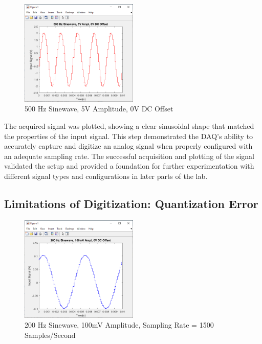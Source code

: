 \documentclass[12pt]{article}
\begin{document}
\begin{figure}[H]
	\centering
	\includegraphics[width=0.5\textwidth]{fig 2.4.PNG}
	\caption{500 Hz Sinewave, 5V Amplitude, 0V DC Offset}
	\label{fig:fig1}
\end{figure}

The acquired signal was plotted, showing a clear sinusoidal shape that matched the properties of the input signal. This step demonstrated the DAQ’s ability to accurately capture and digitize an analog signal when properly configured with an adequate sampling rate. The successful acquisition and plotting of the signal validated the setup and provided a foundation for further experimentation with different signal types and configurations in later parts of the lab.
\newline

\subsection{Limitations of Digitization: Quantization Error}

\begin{figure}[H]
	\centering
	\includegraphics[width=0.5\textwidth]{fig 3.1.PNG}
	\caption{200 Hz Sinewave, 100mV Amplitude, Sampling Rate = 1500 Samples/Second}
	\label{fig:fig2}
\end{figure}
\end{document}
